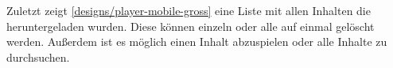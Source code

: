 

Zuletzt zeigt \autoref{designs/player-mobile-gross} eine Liste mit allen Inhalten die heruntergeladen wurden. Diese können einzeln oder alle auf einmal gelöscht werden. Außerdem ist es möglich einen Inhalt abzuspielen oder alle Inhalte zu durchsuchen.

